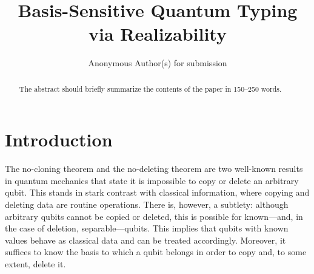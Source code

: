 \documentclass[runningheads,orivec,envcountsame,envcountsect]{llncs}
\begin{document}
\title{Basis-Sensitive Quantum Typing via Realizability}

\author{Anonymous Author(s) for submission}

%
%

\maketitle 

\begin{abstract}
  The abstract should briefly summarize the contents of the paper in 150--250 words.

\end{abstract}



\section{Introduction}
The no-cloning theorem \cite{WoottersZurek1982} and the no-deleting theorem
\cite{PatiBraunstein2000} are two well-known results in quantum mechanics that
state it is impossible to copy or delete an arbitrary qubit. This stands in
stark contrast with classical information, where copying and deleting data are
routine operations. There is, however, a subtlety: although arbitrary qubits
cannot be copied or deleted, this is possible for known---and, in the case of
deletion, separable---qubits. This implies that qubits with known values behave
as classical data and can be treated accordingly. Moreover, it suffices to know
the basis to which a qubit belongs in order to copy and, to some extent, delete it.
\end{document}

